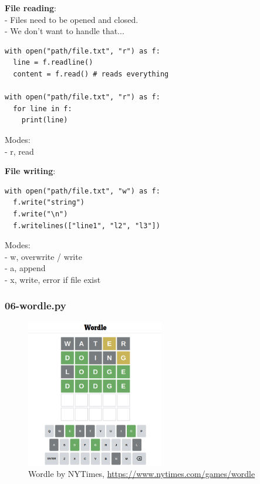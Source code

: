 \documentclass{beamer}
\begin{document}
\begin{frame}[fragile]
	\textbf{File reading}:\\
	- Files need to be opened and closed.\\
	- We don't want to handle that...\\
	\begin{example}
		\begin{verbatim}
with open("path/file.txt", "r") as f:
  line = f.readline()
  content = f.read() # reads everything

with open("path/file.txt", "r") as f: 
  for line in f:
    print(line)
		\end{verbatim}
		Modes:\\
		- r, read\\
	\end{example}
\end{frame}
\begin{frame}[fragile]
	\textbf{File writing}:\\
	\begin{example}
		\begin{verbatim}
with open("path/file.txt", "w") as f:
  f.write("string")
  f.write("\n")
  f.writelines(["line1", "l2", "l3"])
	\end{verbatim}
		Modes:\\
		- w, overwrite / write\\
		- a, append\\
		- x, write, error if file exist
	\end{example}
\end{frame}

\begin{frame}[fragile]
	\frametitle{06-wordle.py}
	\begin{figure}
		\includegraphics[width=6cm]{figures/wordle.png}
		\caption{Wordle by NYTimes, \url{https://www.nytimes.com/games/wordle}}
	\end{figure}
\end{frame}
\end{document}
